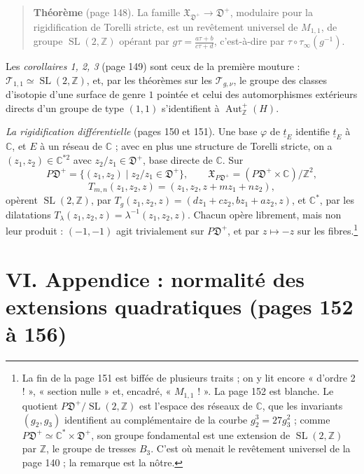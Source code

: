 \documentclass[11pt,a4paper]{article}
\begin{document}
\begin{quote}
\textbf{Théorème} (page 148). La famille $\mathfrak{X}_{\mathfrak{D}^{+}} \to
\mathfrak{D}^{+}$, modulaire pour la rigidification de Torelli stricte, est un
revêtement universel de $M_{1,1}$, de groupe $\operatorname{SL}(2, \mathbb{Z})$
opérant par $g\tau = \frac{a\tau + b}{c\tau + d}$, c'est-à-dire par $\tau \circ
\tau_\infty(g^{-1})$.
\end{quote}
Les \emph{corollaires 1, 2, 3} (page 149) sont ceux de la première mouture :
$\mathcal{T}_{1,1} \simeq \operatorname{SL}(2, \mathbb{Z})$, et, par les
théorèmes sur les $\mathcal{T}_{g,\nu}$, le groupe des classes d'isotopie d'une
surface de genre $1$ pointée et celui des automorphismes extérieurs directs
d'un groupe de type $(1,1)$ s'identifient à $\operatorname{Aut}^{+}_{\mathbb{Z}}(H)$.

\emph{La rigidification différentielle} (pages 150 et 151). Une base $\varphi$
de $\underline{t}_E$ identifie $\underline{t}_E$ à $\mathbb{C}$, et $E$ à un
réseau de $\mathbb{C}$ ; avec en plus une structure de Torelli stricte, on a
$(z_1, z_2) \in \mathbb{C}^{*2}$ avec $z_2/z_1 \in \mathfrak{D}^{+}$, base directe
de $\mathbb{C}$. Sur
\[
P\mathfrak{D}^{+} = \{ (z_1, z_2) \mid z_2/z_1 \in \mathfrak{D}^{+} \}, \qquad
\mathfrak{X}_{P\mathfrak{D}^{+}} = (P\mathfrak{D}^{+} \times \mathbb{C})/\mathbb{Z}^2,
\]
\[
T_{m,n}(z_1, z_2, z) = (z_1, z_2, z + m z_1 + n z_2),
\]
opèrent $\operatorname{SL}(2, \mathbb{Z})$, par $T_g(z_1, z_2, z) = (dz_1 + cz_2,
bz_1 + az_2, z)$, et $\mathbb{C}^{*}$, par les dilatations $T_\lambda(z_1, z_2, z)
= \lambda^{-1}(z_1, z_2, z)$. Chacun opère librement, mais non leur produit :
$(-1, -1)$ agit trivialement sur $P\mathfrak{D}^{+}$, et par $z \mapsto -z$ sur les
fibres.\footnote{La fin de la page 151 est biffée de plusieurs traits ; on y lit
encore « d'ordre 2 ! », « section nulle » et, encadré, « $M_{1,1}$ ! ». La
page 152 est blanche. Le quotient $P\mathfrak{D}^{+}/\operatorname{SL}(2,
\mathbb{Z})$ est l'espace des réseaux de $\mathbb{C}$, que les invariants
$(g_2, g_3)$ identifient au complémentaire de la courbe $g_2^3 = 27g_3^2$ ;
comme $P\mathfrak{D}^{+} \simeq \mathbb{C}^{*} \times \mathfrak{D}^{+}$, son
groupe fondamental est une extension de $\operatorname{SL}(2, \mathbb{Z})$ par
$\mathbb{Z}$, le groupe de tresses $B_3$. C'est où menait le revêtement
universel de la page 140 ; la remarque est la nôtre.}

\section*{VI. Appendice : normalité des extensions quadratiques (pages 152 à 156)}
\end{document}
